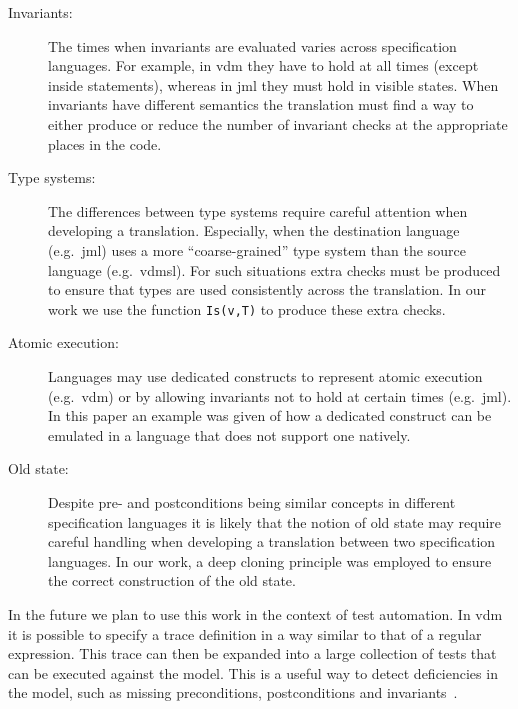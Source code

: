 \begin{description}

\item[Invariants:] The times when invariants are evaluated varies
  across specification languages. For example, in \ac{vdm} they have
  to hold at all times (except inside  statements), whereas
  in \ac{jml} they must hold in visible states. When invariants have
  different semantics the translation must find a way to either
  produce or reduce the number of invariant checks at the appropriate
  places in the code.

\item[Type systems:] The differences between type systems require
  careful attention when developing a translation. Especially, when
  the destination language (e.g.\ \ac{jml}) uses a more
  ``coarse-grained'' type system than the source language (e.g.\
  \ac{vdmsl}). For such situations extra checks must be produced to
  ensure that types are used consistently across the translation. In
  our work we use the function \texttt{Is(v,T)} to produce these extra
  checks.

\item [Atomic execution:] Languages may use dedicated constructs to
  represent atomic execution (e.g.\ \ac{vdm}) or by allowing
  invariants not to hold at certain times (e.g.\ \ac{jml}). In this
  paper an example was given of how a dedicated construct can be
  emulated in a language that does not support one natively.

\item [Old state:] Despite pre- and postconditions being similar
  concepts in different specification languages it is likely that the
  notion of old state may require careful handling when developing a
  translation between two specification languages. In our work, a deep
  cloning principle was employed to ensure the correct construction of
  the old state.

\end{description}

In the future we plan to use this work in the context of test
automation. In \ac{vdm} it is possible to specify a trace definition
in a way similar to that of a regular expression. This trace can then
be expanded into a large collection of tests that can be executed
against the model. This is a useful way to detect deficiencies in the
model, such as missing preconditions, postconditions and
invariants~\cite{Larsen&10c}.

